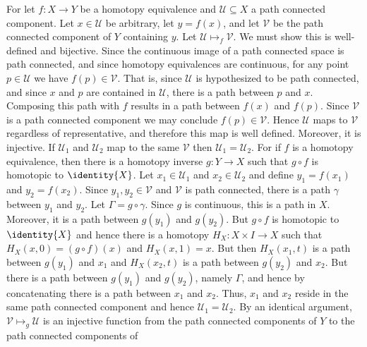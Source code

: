\documentclass{article}                                                        %
\begin{document}
    \begin{solution}
        For let $f:X\rightarrow{Y}$ be a homotopy equivalence and
        $\mathcal{U}\subseteq{X}$ a path connected component. Let
        $x\in\mathcal{U}$ be arbitrary, let $y=f(x)$, and let $\mathcal{V}$ be
        the path connected component of $Y$ containing $y$. Let
        $\mathcal{U}\mapsto_{f}\mathcal{V}$. We must show this is well-defined
        and bijective. Since the continuous image of a path connected space is
        path connected, and since homotopy equivalences are continuous, for any
        point $p\in\mathcal{U}$ we have $f(p)\in\mathcal{V}$. That is, since
        $\mathcal{U}$ is hypothesized to be path connected, and since $x$ and
        $p$ are contained in $\mathcal{U}$, there is a path between $p$ and $x$.
        Composing this path with $f$ results in a path between $f(x)$ and
        $f(p)$. Since $\mathcal{V}$ is a path connected component we may
        conclude $f(p)\in\mathcal{V}$. Hence $\mathcal{U}$ maps to $\mathcal{V}$
        regardless of representative, and therefore this map is well defined.
        Moreover, it is injective. If
        $\mathcal{U}_{1}$ and $\mathcal{U}_{2}$ map to the same $\mathcal{V}$
        then $\mathcal{U}_{1}=\mathcal{U}_{2}$. For if $f$ is a homotopy
        equivalence, then there is a homotopy inverse $g:Y\rightarrow{X}$ such
        that $g\circ{f}$ is homotopic to $\identity{X}$. Let
        $x_{1}\in\mathcal{U}_{1}$ and $x_{2}\in\mathcal{U}_{2}$ and define
        $y_{1}=f(x_{1})$ and $y_{2}=f(x_{2})$. Since $y_{1},y_{2}\in\mathcal{V}$
        and $\mathcal{V}$ is path connected, there is a path $\gamma$ between
        $y_{1}$ and $y_{2}$. Let $\Gamma=g\circ\gamma$. Since $g$ is continuous,
        this is a path in $X$. Moreover, it is a path between $g(y_{1})$ and
        $g(y_{2})$. But $g\circ{f}$ is homotopic to $\identity{X}$
        and hence there is a homotopy $H_{X}:X\times{I}\rightarrow{X}$ such that
        $H_{X}(x,0)=(g\circ{f})(x)$ and $H_{X}(x,1)=x$. But then
        $H_{X}(x_{1},t)$ is a path between $g(y_{1})$ and $x_{1}$ and
        $H_{X}(x_{2},t)$ is a path between $g(y_{2})$ and $x_{2}$. But there is
        a path between $g(y_{1})$ and $g(y_{2})$, namely $\Gamma$, and hence by
        concatenating there is a path between $x_{1}$ and $x_{2}$. Thus,
        $x_{1}$ and $x_{2}$ reside in the same path connected component and
        hence $\mathcal{U}_{1}=\mathcal{U}_{2}$. By an identical argument,
        $\mathcal{V}\mapsto_{g}\mathcal{U}$ is an injective function from the
        path connected components of $Y$ to the path connected components of

\end{solution}
\end{document}
